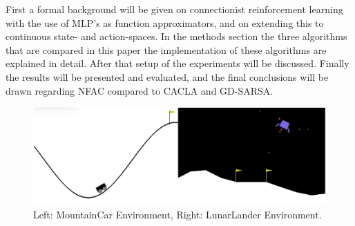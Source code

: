 First a formal background will be given on connectionist reinforcement learning with the use of MLP's as function approximators,
and on extending this to continuous state- and action-spaces. In the methods section the three algorithms that are compared
 in this paper the implementation of these algorithms are explained in detail. After that setup of the experiments will be discussed.
Finally the results will be presented and evaluated, and the final conclusions will be drawn regarding NFAC compared to CACLA and GD-SARSA.

\begin{figure}[t]
 \centering 
    \includegraphics[width = 0.7\columnwidth]{figs/mountainlunar.png}
 \caption{Left: MountainCar Environment, Right: LunarLander Environment.}
\label{fig:mountainlunar}
\end{figure}
